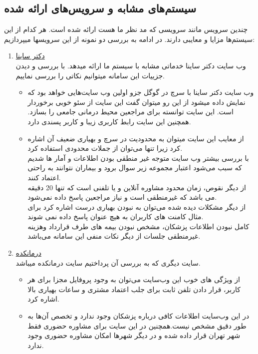 \documentclass[a4paper]{article}
\begin{document}
		
		\subsection{سیستم‌های مشابه و سرویس‌های ارائه شده}
		چندین سرویس مانند سرویسی که مد نظر ما هست ارائه شده است. هر کدام از این سیستم‌ها مزایا و معایبی دارند. در ادامه به بررسی دو نمونه از این سرویسها میپردازیم:
		\begin{enumerate}
			
		\item \href{https://www.drsaina.com/consultation?gclid=CjwKCAjw7c2pBhAZEiwA88pOF8SCqb0W9MbWxGtNfhIICKenmpTzlyl0pyB7eLBUyRKcnRM4W1w9wRoClzsQAvD_BwE}{دکتر ساینا}\\
		وب سایت دکتر ساینا خدماتی مشابه با سیستم ما ارائه میدهد. با بررسی و دیدن جزییات این سامانه میتوانیم نکاتی را بررسی نماییم. 
		\begin{itemize}
			\item وب سایت دکتر ساینا با سرچ در گوگل جزو اولین وب سایت‌هایی خواهد بود که نمایش داده میشود از این رو میتوان گفت این سایت از سئو خوبی برخوردار است. این سایت توانسته برای مراجعین محیط درمانی جامعی را بسازد. همچنین این سایت رابط کاربری زیبا و کاربر پسندی دارد.
			
			\item از معایب این سایت میتوان به محدودیت در سرچ و بهیاری ضعیف آن اشاره کرد زیرا تنها می‌توان از جملات محدودی استفاده کرد.
\\		با بررسی بیشتر وب سایت متوجه غیر منطقی بودن اطلاعات و آمار ها شدیم که سبب می‌شود اعتبار مجموعه زیر سوال برود و بیماران نتوانند به راحتی اعتماد کنند.
\\		از دیگر نقوص، زمان محدود مشاوره آنلاین و یا تلفنی است که تنها 20 دقیقه می باشد که غیرمنطقی است و نیاز مراجعین پاسخ داده نمی‌شود.
\\		از دیگر مشکلات دیده شده می‌توان به نبودن بهیاری درست اشاره کرد برای مثال کامنت های کاربران به هیچ عنوان پاسخ داده نمی شوند.
\\		کامل نبودن اطلاعات پزشکان، مشخص نبودن بیمه های طرف قرارداد وهزینه غیرمنطقی جلسات از دیگر نکات منفی این سامانه می‌باشد.
		\end{itemize}
		
		\item \href{https://www.google.com/url?sa=t&rct=j&q=&esrc=s&source=web&cd=&cad=rja&uact=8&ved=2ahUKEwjj8qObiomCAxVxVKQEHShlDS0QFnoECA0QAQ&url=https%3A%2F%2Fwww.darmankade.com%2F&usg=AOvVaw3kmECL-fyw2GEWMgRr5Eir&opi=89978449}{درمانکده}\\
		سایت دیگری که به بررسی آن پرداختیم سایت درمانکده میباشد.
		\begin{itemize}
			\item از ویژگی های خوب این وب‌سایت می‌توان به وجود پروفایل مجزا برای هر کاربر، قرار دادن تلفن ثابت برای جلب اعتماد مشتری و ساعات بهیاری بالا اشاره کرد.
			\item در این وب‌سایت اطلاعات کافی درباره پزشکان وجود ندارد و تخصص آن‌ها به طور دقیق مشخص نیست.همچنین در این سایت برای مشاوره حضوری فقط شهر تهران قرار داده شده و در دیگر شهرها امکان مشاوره حضوری وجود ندارد.
		\end{itemize}
		
		
	\end{enumerate}
		
\end{document}
